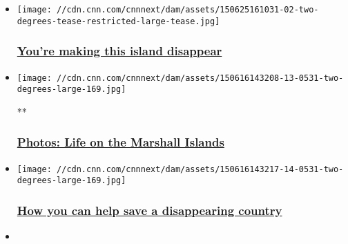 \begin{itemize}
\item
  \href{http://www.cnn.com/interactive/2015/06/opinions/sutter-two-degrees-marshall-islands/}{}

  \texttt{[image: //cdn.cnn.com/cnnnext/dam/assets/150625161031-02-two-degrees-tease-restricted-large-tease.jpg]}

  \hypertarget{youre-making-this-island-disappear}{%
  \subsubsection{\texorpdfstring{\href{http://www.cnn.com/interactive/2015/06/opinions/sutter-two-degrees-marshall-islands/}{You're
  making this island
  disappear}}{You're making this island disappear}}\label{youre-making-this-island-disappear}}
\item
  \href{/2015/06/28/opinions/gallery/marshall-islands-two-degrees/index.html}{}

  \texttt{[image: //cdn.cnn.com/cnnnext/dam/assets/150616143208-13-0531-two-degrees-large-169.jpg]}

  **

  \hypertarget{photos-life-on-the-marshall-islands-}{%
  \subsubsection{\texorpdfstring{\href{/2015/06/28/opinions/gallery/marshall-islands-two-degrees/index.html}{Photos:
  Life on the Marshall Islands
  }}{Photos: Life on the Marshall Islands }}\label{photos-life-on-the-marshall-islands-}}
\item
  \href{/2015/06/29/opinions/sutter-help-marshall-islands-climate/index.html}{}

  \texttt{[image: //cdn.cnn.com/cnnnext/dam/assets/150616143217-14-0531-two-degrees-large-169.jpg]}

  \hypertarget{how-you-can-help-save-a-disappearing-country}{%
  \subsubsection{\texorpdfstring{\href{/2015/06/29/opinions/sutter-help-marshall-islands-climate/index.html}{How
  you can help save a disappearing
  country}}{How you can help save a disappearing country}}\label{how-you-can-help-save-a-disappearing-country}}
\item
  \href{/videos/us/2015/06/24/orig-sutter-climate-change-marshall-islands-sinking-two-degrees.cnn}{}


\end{itemize}
